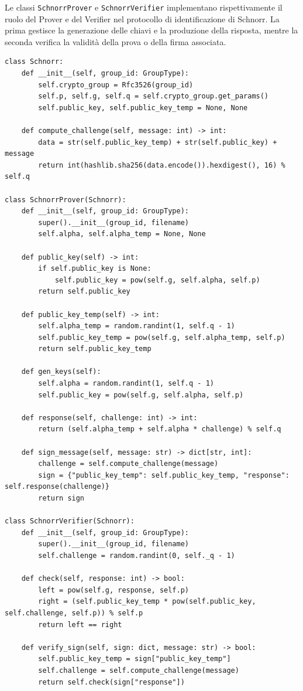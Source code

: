 Le classi \texttt{SchnorrProver} e \texttt{SchnorrVerifier} implementano rispettivamente
il ruolo del Prover e del Verifier nel protocollo di identificazione di Schnorr.
La prima gestisce la generazione delle chiavi e la produzione della risposta,
mentre la seconda verifica la validità della prova o della firma associata.

\begin{listing}
\begin{verbatim}
class Schnorr:
    def __init__(self, group_id: GroupType):
        self.crypto_group = Rfc3526(group_id)
        self.p, self.g, self.q = self.crypto_group.get_params()
        self.public_key, self.public_key_temp = None, None

    def compute_challenge(self, message: int) -> int:
        data = str(self.public_key_temp) + str(self.public_key) + message
        return int(hashlib.sha256(data.encode()).hexdigest(), 16) % self.q

class SchnorrProver(Schnorr):
    def __init__(self, group_id: GroupType):
        super().__init__(group_id, filename)
        self.alpha, self.alpha_temp = None, None
        
    def public_key(self) -> int:
        if self.public_key is None:
            self.public_key = pow(self.g, self.alpha, self.p)
        return self.public_key

    def public_key_temp(self) -> int:
        self.alpha_temp = random.randint(1, self.q - 1)
        self.public_key_temp = pow(self.g, self.alpha_temp, self.p)
        return self.public_key_temp

    def gen_keys(self):
        self.alpha = random.randint(1, self.q - 1)
        self.public_key = pow(self.g, self.alpha, self.p)

    def response(self, challenge: int) -> int:
        return (self.alpha_temp + self.alpha * challenge) % self.q

    def sign_message(self, message: str) -> dict[str, int]:
        challenge = self.compute_challenge(message)
        sign = {"public_key_temp": self.public_key_temp, "response": self.response(challenge)}
        return sign
        
class SchnorrVerifier(Schnorr):
    def __init__(self, group_id: GroupType):
        super().__init__(group_id, filename)
        self.challenge = random.randint(0, self._q - 1)

    def check(self, response: int) -> bool:
        left = pow(self.g, response, self.p)
        right = (self.public_key_temp * pow(self.public_key, self.challenge, self.p)) % self.p
        return left == right
    
    def verify_sign(self, sign: dict, message: str) -> bool:
        self.public_key_temp = sign["public_key_temp"]
        self.challenge = self.compute_challenge(message)
        return self.check(sign["response"])
\end{verbatim}
\caption{Classi \texttt{SchnorrProver} e \texttt{SchnorrVerifier}.}
\end{listing}

\clearpage
